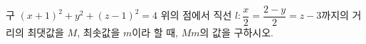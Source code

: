 구 $(x+1)^2+y^2+(z-1)^2=4$ 위의 점에서 직선 $l\colon \dfrac{x}{2}=\dfrac{2-y}{2}=z-3$까지의 거리의 최댓값을 $M$, 최솟값을 $m$이라 할 때, $Mm$의 값을 구하시오.
